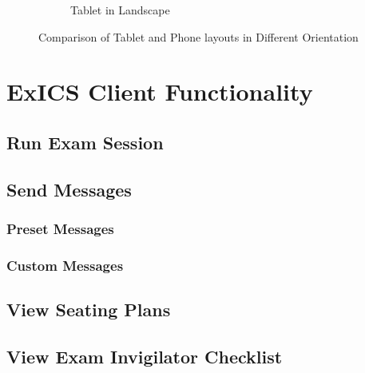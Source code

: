 \begin{figure}[h]
\begin{subfigure}[b]{0.9\textwidth}
		\caption{Tablet in Landscape}
		\label{subfig:tablet_landscape}
	\end{subfigure}
	\caption{Comparison of Tablet and Phone layouts in Different Orientation}
	\label{fig:orientation_comparison}
\end{figure}

\FloatBarrier

\section{ExICS Client Functionality}
\label{sec:ExICSfunctionality}

\subsection{Run Exam Session}

\subsection{Send Messages}

\subsubsection{Preset Messages}

\subsubsection{Custom Messages}

\subsection{View Seating Plans}

\subsection{View Exam Invigilator Checklist}















